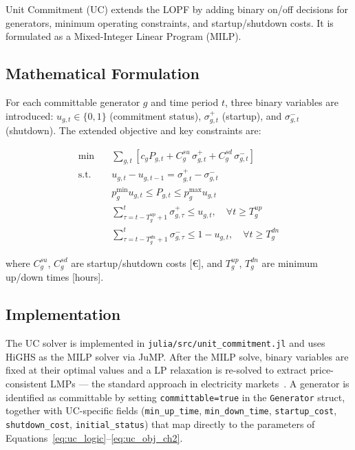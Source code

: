 Unit Commitment (UC) extends the LOPF by adding binary on/off decisions for generators, minimum operating constraints, and startup/shutdown costs. It is formulated as a Mixed-Integer Linear Program (MILP).

\subsection{Mathematical Formulation}

For each committable generator $g$ and time period $t$, three binary variables are introduced: $u_{g,t} \in \{0,1\}$ (commitment status), $\sigma_{g,t}^+$ (startup), and $\sigma_{g,t}^-$ (shutdown). The extended objective and key constraints are:

\begin{align}
    \min \quad & \sum_{g,t} \left[ c_g P_{g,t} + C_g^{su}\,\sigma_{g,t}^+ + C_g^{sd}\,\sigma_{g,t}^- \right]
    \label{eq:uc_obj} \\
    \text{s.t.} \quad
    & u_{g,t} - u_{g,t-1} = \sigma_{g,t}^+ - \sigma_{g,t}^-
    \label{eq:uc_transition} \\
    & p_g^\text{min} u_{g,t} \leq P_{g,t} \leq p_g^\text{max} u_{g,t}
    \label{eq:uc_dispatch} \\
    & \sum_{\tau = t - T_g^{up}+1}^{t} \sigma_{g,\tau}^+ \leq u_{g,t},
    \quad \forall t \geq T_g^{up}
    \label{eq:uc_minup} \\
    & \sum_{\tau = t - T_g^{dn}+1}^{t} \sigma_{g,\tau}^- \leq 1 - u_{g,t},
    \quad \forall t \geq T_g^{dn}
    \label{eq:uc_mindn}
\end{align}

where $C_g^{su}$, $C_g^{sd}$ are startup/shutdown costs [\euro], and $T_g^{up}$, $T_g^{dn}$ are minimum up/down times [hours].

\subsection{Implementation}

The UC solver is implemented in \texttt{julia/src/unit\_commitment.jl} and uses HiGHS as the MILP solver via JuMP. After the MILP solve, binary variables are fixed at their optimal values and a LP relaxation is re-solved to extract price-consistent LMPs --- the standard approach in electricity markets~\cite{oneill2005}. A generator is identified as committable by setting \texttt{committable=true} in the \texttt{Generator} struct, together with UC-specific fields (\texttt{min\_up\_time}, \texttt{min\_down\_time}, \texttt{startup\_cost}, \texttt{shutdown\_cost}, \texttt{initial\_status}) that map directly to the parameters of Equations~\eqref{eq:uc_logic}--\eqref{eq:uc_obj_ch2}.

